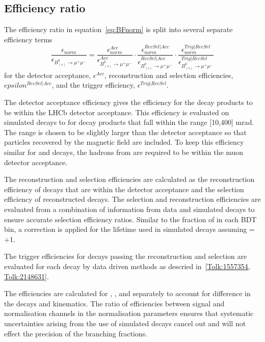 {{{\subsection{Efficiency ratio}
The efficiency ratio in equation~\ref{eq:BFnorm} is split into several separate efficiency terms 
\begin{equation}
\frac{\epsilon_{norm}}{\epsilon_{B^{0}_{(s)} \to \mu^{+} \mu^{-}}}  =  \frac{\epsilon^{Acc}_{norm}}{\epsilon^{Acc}_{B^{0}_{(s)} \to \mu^{+} \mu^{-}}} \cdot \frac{\epsilon^{RecSel|Acc}_{norm}}{\epsilon^{RecSel|Acc}_{B^{0}_{(s)} \to \mu^{+} \mu^{-}}} \cdot \frac{\epsilon^{Trig|RecSel}_{norm}}{\epsilon^{Trig|RecSel}_{B^{0}_{(s)} \to \mu^{+} \mu^{-}}}
\label{eq:BFnormDetailed}
\end{equation}
for the detector acceptance, $\epsilon^{Acc}$, reconstruction and selection efficiencies, $epsilon^{RecSel|Acc}$, and the trigger efficiency, $\epsilon^{Trig|RecSel}$. 

The detector acceptance efficiency gives the efficiency for the decay products to be within the LHCb detector acceptance. This efficiency is evaluated on simulated decays to for decay products that fall within the range [10,400] mrad. The range is chosen to be slightly larger than the detector acceptance so that particles recovered by the magnetic field are included. To keep this efficiency similar for \bmumu and \bdkpi decays, the hadrons from \bdkpi are required to be within the muon detector acceptance. 

The reconstruction and selection efficiencies are calculated as the reconstruction efficiency of decays that are within the detector acceptance and the selection efficiency of reconstructed decays. The selection and reconstruction efficiencies are evaluated from a combination of information from data and simulated decays to ensure accurate selection efficiency ratios. Similar to the fraction of \bsmumu in each BDT bin, a correction is applied for the lifetime used in simulated \bsmumu decays assuming \ADG = +1. 

The trigger efficiencies for decays passing the reconstruction and selection are evaluated for each decay by data driven methods as descried in~\ref{Tolk:1557354, Tolk:2148631}. 

The efficiencies are calculated for \bsmumu, \bdmumu, \bdkpi and \bujpsik separately to account for difference in the decays and kinematics. The ratio of efficiencies between signal and normalisation channels in the normalisation parameters ensures that systematic uncertainties arising from the use of simulated decays cancel out and will not effect the precision of the \bmumu branching fractions.

}}}
